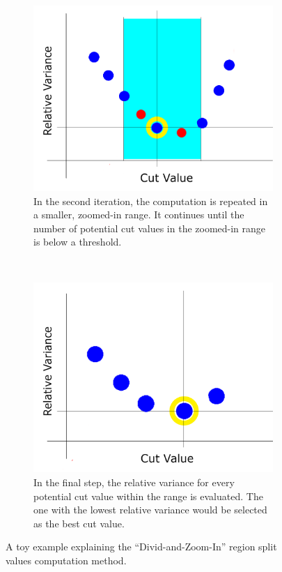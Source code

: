 \begin{figure}[!htbp]
	\begin{subfigure}[t]{0.45\textwidth}
		\centering
		\includegraphics[width=1.0 \textwidth]{"fig/cbla/divide-and-zoom-in_3"}
		\caption{In the second iteration, the computation is repeated in a smaller, zoomed-in range. It continues until the number of potential cut values in the zoomed-in range is below a threshold.}
		\label{fig:divide-and-zoom-in_3}
	\end{subfigure}
	~
	\begin{subfigure}[t]{0.45\textwidth}
		\centering
		\includegraphics[width=1.0 \textwidth]{"fig/cbla/divide-and-zoom-in_4"}
		\caption{In the final step, the relative variance for every potential cut value within the range is evaluated. The one with the lowest relative variance would be selected as the best cut value.}
		\label{fig:divide-and-zoom-in_4}
	\end{subfigure}
	\caption[Illustrations explaining the ``Divid-and-Zoom-In'' region split values computation method]{A toy example explaining the ``Divid-and-Zoom-In'' region split values computation method.}
	\label{fig:divide-and-zoom-in}
\end{figure}

